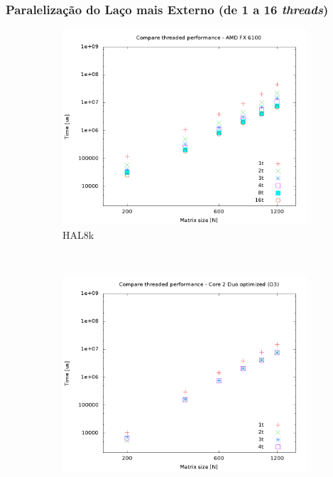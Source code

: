 \documentclass[a4paper, 12pt]{article}
\begin{document}
\subsubsection{Paralelização do Laço mais Externo (de 1 a 16 \textit{threads})}

\begin{figure}[H]
    \centering
    \begin{subfigure}[H]{0.5\textwidth}
        \includegraphics[width=\textwidth]{HAL_par_threads}
        \caption{HAL8k}
        \label{fig:8k_par_threads}
    \end{subfigure}%
    ~ %
    \begin{subfigure}[H]{0.5\textwidth}
        \includegraphics[width=\textwidth]{hpops2_O3_par_threads}

\end{subfigure}
\end{figure}
\end{document}
